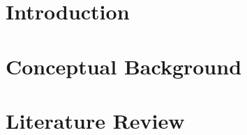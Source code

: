 \documentclass[10pt,a4paper]{report} %
\begin{document}








\chapter{Introduction}

\label{chapter:introduction}

% 








\chapter{Conceptual Background}

\label{chapter:bg}

% 







\chapter{Literature Review}

\label{chapter:review}

% 




\end{document}
